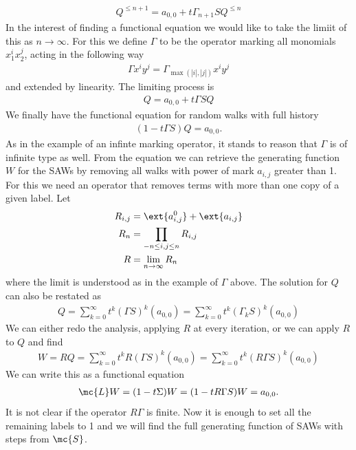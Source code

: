 \begin{example}
\begin{align}
	 Q^{\leq n+1} = a_{0,0} + t\Gamma_{n+1}SQ^{\leq n}
\end{align}
In the interest of finding a functional equation we would like to take the limiit of this as $n \to \infty$. For this we define $\Gamma$ to be the operator marking all monomials $x_1^ix_2^j$, acting in the following way
\begin{align}
	\Gamma x^i y^j = \Gamma_{\max(|i|,|j|)} x^i y^j
\end{align}
and extended by linearity. The limiting process is
\begin{align}
	Q = a_{0,0} + t \Gamma SQ
\end{align}
We finally have the functional equation for random walks with full history
\begin{align}
	(1 -t\Gamma S)Q = a_{0,0}.
\end{align}
As in the example of an infinte marking operator, it stands to reason that $\Gamma$ is of infinite type as well. From the equation we can retrieve the generating function $W$ for the SAWs by removing all walks with power of mark $a_{i,j}$ greater than 1. For this we need an operator that removes terms with more than one copy of a given label. Let
\begin{align}
	R_{i,j} &= \ext{a_{i,j}^0} + \ext{a_{i,j}}\\
	R_n &= \prod_{-n\leq i,j \leq n} R_{i,j}\\
	R &= \lim_{n\to \infty} R_n
\end{align}
where the limit is understood as in the example of $\Gamma$ above. The solution for $Q$ can also be restated as
\begin{align}
	Q = \sum_{k=0}^{\infty} t^k (\Gamma S)^{k}(a_{0,0}) = \sum_{k=0}^{\infty} t^k (\Gamma_k S)^{k}(a_{0,0}) 
\end{align}
We can either redo the analysis, applying $R$ at every iteration, or we can apply $R$ to $Q$ and find
\begin{align}
	W = RQ = \sum_{k=0}^{\infty} t^k R(\Gamma S)^{k}(a_{0,0}) = \sum_{k=0}^{\infty} t^k (R\Gamma S)^{k}(a_{0,0}) 
\end{align}
We can write this as a functional equation
\begin{align}
	\mc{L} W = (1-t\Sigma)W = (1-tR\Gamma S)W = a_{0,0}.
\end{align}
It is not clear if the operator $R\Gamma$ is finite. Now it is enough to set all the remaining labels to 1 and we will find the full generating function of SAWs with steps from $\mc{S}$.


\end{example}
